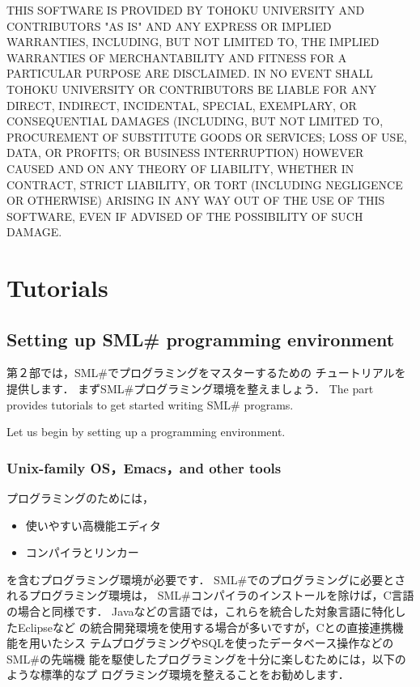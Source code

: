 \documentclass{jbook}
\newcommand{\txt}[2]{#2}
\newcommand{\smlsharp}{SML\#}
\begin{document}
THIS SOFTWARE IS PROVIDED BY TOHOKU UNIVERSITY AND CONTRIBUTORS "AS IS"
AND ANY EXPRESS OR IMPLIED WARRANTIES, INCLUDING, BUT NOT LIMITED TO,
THE IMPLIED WARRANTIES OF MERCHANTABILITY AND FITNESS FOR A PARTICULAR
PURPOSE ARE DISCLAIMED. IN NO EVENT SHALL TOHOKU UNIVERSITY OR
CONTRIBUTORS BE LIABLE FOR ANY DIRECT, INDIRECT, INCIDENTAL, SPECIAL,
EXEMPLARY, OR CONSEQUENTIAL DAMAGES (INCLUDING, BUT NOT LIMITED TO,
PROCUREMENT OF SUBSTITUTE GOODS OR SERVICES; LOSS OF USE, DATA, OR
PROFITS; OR BUSINESS INTERRUPTION) HOWEVER CAUSED AND ON ANY THEORY OF
LIABILITY, WHETHER IN CONTRACT, STRICT LIABILITY, OR TORT (INCLUDING
NEGLIGENCE OR OTHERWISE) ARISING IN ANY WAY OUT OF THE USE OF THIS
SOFTWARE, EVEN IF ADVISED OF THE POSSIBILITY OF SUCH DAMAGE.

\part{\txt{チュートリアル}{Tutorials}}
\label{part:tutorial}

\chapter{\txt{\smlsharp{}プログラミング環境の準備}
{Setting up \smlsharp{} programming environment}
}
\label{chap:tutorialEnvironment}

\ifjp%
	第２部では，\smlsharp{}でプログラミングをマスターするための
チュートリアルを提供します．
	まず\smlsharp{}プログラミング環境を整えましょう．
\else%
	The part~\ref{part:tutorial} provides tutorials to get started
writing \smlsharp{} programs.

	Let us begin by setting up a programming environment.
\fi%

\section{
\txt{Unix系OS，Emacsエディタ，その他ツールの整備}
    {Unix-family OS，Emacs，and other tools}}
\label{sec:tutorialEnvironmemt}

\ifjp%
	プログラミングのためには，
\begin{itemize}
\item 使いやすい高機能エディタ
\item コンパイラとリンカー
\end{itemize}
を含むプログラミング環境が必要です．
	\smlsharp{}でのプログラミングに必要とされるプログラミング環境は，
\smlsharp{}コンパイラのインストールを除けば，C言語の場合と同様です．
	Javaなどの言語では，これらを統合した対象言語に特化したEclipseなど
の統合開発環境を使用する場合が多いですが，Cとの直接連携機能を用いたシス
テムプログラミングやSQLを使ったデータベース操作などの\smlsharp{}の先端機
能を駆使したプログラミングを十分に楽しむためには，以下のような標準的なプ
ログラミング環境を整えることをお勧めします．
\end{document}
